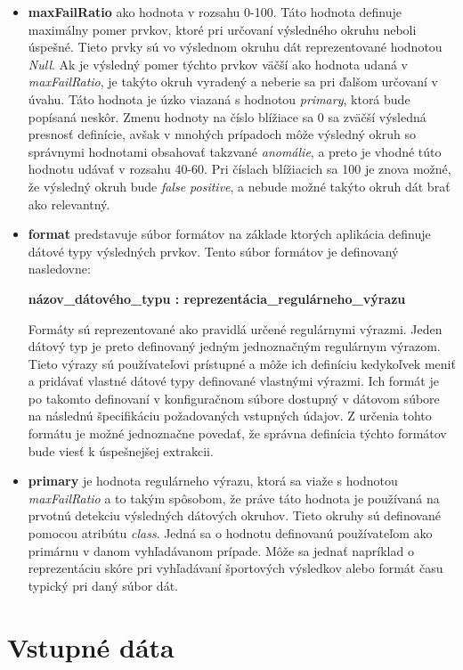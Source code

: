 \begin{itemize}
  \item \textbf{maxFailRatio} ako hodnota v rozsahu 0-100. Táto hodnota definuje maximálny pomer prvkov, ktoré pri určovaní výsledného okruhu neboli úspešné. Tieto prvky sú vo výslednom okruhu dát reprezentované hodnotou \textit{Null}. Ak je výsledný pomer týchto prvkov väčší ako hodnota udaná v \textit{maxFailRatio}, je takýto okruh vyradený a neberie sa pri ďalšom určovaní v úvahu. Táto hodnota je úzko viazaná s hodnotou \textit{primary}, ktorá bude popísaná neskôr. Zmenu hodnoty na číslo blížiace sa 0 sa zväčší výsledná presnosť definície, avšak v mnohých prípadoch môže výsledný okruh so správnymi hodnotami obsahovať takzvané \textit{anomálie}, a preto je vhodné túto hodnotu udávať v rozsahu 40-60. Pri číslach blížiacich sa 100 je znova možné, že výsledný okruh bude \textit{false positive}, a nebude možné takýto okruh dát brať ako relevantný.
  \item \textbf{format} predstavuje súbor formátov na základe ktorých aplikácia definuje dátové typy výsledných prvkov. Tento súbor formátov je definovaný nasledovne:
  
  \textbf{názov\_dátového\_typu : reprezentácia\_regulárneho\_výrazu}
  
  Formáty sú reprezentované ako pravidlá určené regulárnymi výrazmi. Jeden  dátový typ je preto definovaný jedným jednoznačným regulárnym výrazom. Tieto výrazy sú používateľovi prístupné a môže ich definíciu kedykoľvek meniť a pridávať vlastné dátové typy definované vlastnými výrazmi. Ich formát je po takomto definovaní v konfiguračnom súbore dostupný v dátovom súbore na následnú špecifikáciu požadovaných vstupných údajov. Z určenia tohto formátu je možné jednoznačne povedať, že správna definícia týchto formátov bude viesť k úspešnejšej extrakcii. 
  
  \item \textbf{primary} je hodnota regulárneho výrazu, ktorá sa viaže s hodnotou \textit{maxFailRatio} a to takým spôsobom, že práve táto hodnota je používaná na prvotnú detekciu výsledných dátových okruhov. Tieto okruhy sú definované pomocou atribútu \textit{class}. Jedná sa o hodnotu definovanú používateľom ako primárnu v danom vyhľadávanom prípade. Môže sa jednať napríklad o reprezentáciu skóre pri vyhľadávaní športových výsledkov alebo formát času typický pri daný súbor dát. 
\end{itemize}

\section{Vstupné dáta}

